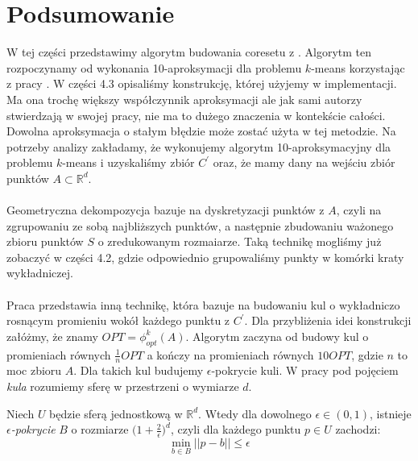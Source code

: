 \section{Podsumowanie}

W tej części przedstawimy algorytm budowania coresetu z \cite{DBLP:journals/ki/MunteanuS18}.
Algorytm ten rozpoczynamy od wykonania 10-aproksymacji dla problemu $k$-means korzystając z pracy \cite{Arya2004LocalSH}.
W części 4.3 opisaliśmy konstrukcję, której użyjemy w implementacji.
Ma ona trochę większy współczynnik aproksymacji ale jak sami autorzy \cite{DBLP:journals/ki/MunteanuS18} stwierdzają w swojej pracy, nie ma to dużego znaczenia w kontekście całości.
Dowolna aproksymacja o stałym błędzie może zostać użyta w tej metodzie.
Na potrzeby analizy zakładamy, że wykonujemy algorytm 10-aproksymacyjny dla problemu $k$-means i uzyskaliśmy zbiór $C^{'}$ oraz, że mamy dany na wejściu zbiór punktów $A \subset \mathbb{R}^d$.
\\~\\
Geometryczna dekompozycja bazuje na dyskretyzacji punktów z $A$, czyli na zgrupowaniu ze sobą najbliższych punktów, a następnie zbudowaniu ważonego zbioru punktów $S$ o zredukowanym rozmaiarze.
Taką technikę mogliśmy już zobaczyć w części 4.2, gdzie odpowiednio grupowaliśmy punkty w komórki kraty wykładniczej.
\\~\\
Praca \cite{DBLP:journals/ki/MunteanuS18} przedstawia inną technikę, która bazuje na budowaniu kul o wykładniczo rosnącym promieniu wokół każdego punktu z $C^{'}$.
Dla przybliżenia idei konstrukcji załóżmy, że znamy $OPT = \phi_{opt}^{k}(A)$.
Algorytm zaczyna od budowy kul o promieniach równych $\frac{1}{n}OPT$ a kończy na promieniach równych $10 OPT$, gdzie $n$ to moc zbioru $A$.
Dla takich kul budujemy $\epsilon$-pokrycie kuli.
W pracy pod pojęciem \textit{kula} rozumiemy sferę w przestrzeni o wymiarze $d$.

\begin{lemma}{\cite{pisier_1989}}
    Niech $U$ będzie sferą jednostkową w $\mathbb{R}^{d}$.
    Wtedy dla dowolnego $\epsilon \in (0,1)$, istnieje \textit{$\epsilon$-pokrycie} $B$ o rozmiarze $\Big(1 +\frac{2}{\epsilon}\Big)^{d}$, czyli dla każdego punktu $p \in U$ zachodzi:
    \begin{equation}
        \min_{b \in B} ||p-b|| \leq \epsilon
    \end{equation}
\end{lemma}

